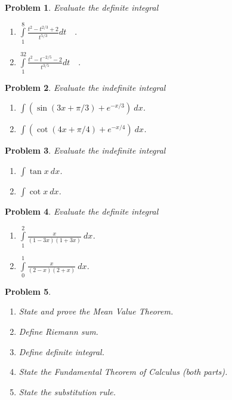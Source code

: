 \documentclass{article}
\newtheorem{problem}{Problem}
\begin{document}
\begin{problem}
Evaluate the definite integral
\begin{enumerate}
\item $\int\limits_{1}^{8} \frac{t^{2}-t^{2/3}+2}{t^{5/3}} dt\quad .$
\item $\int\limits_{1}^{32} \frac{t^{2}-t^{-2/5}-2}{t^{3/5}} dt\quad .$
\end{enumerate}
\end{problem}
\begin{problem}
Evaluate the indefinite integral
\begin{enumerate}
\item $\int (\sin (3x+\pi/3)+e^{-x/3} ) ~dx$.
\item $\int (\cot (4x+\pi/4)+e^{-x/4} )~dx$.
\end{enumerate}
\end{problem}
\begin{problem}
Evaluate the indefinite integral
\begin{enumerate}
\item $\int \tan x ~dx$. \hfill{~}
\item $\int \cot x ~dx$. \hfill{~}
\end{enumerate}
\end{problem}
\begin{problem}
Evaluate the definite integral
\begin{enumerate}
\item $\int\limits_{1}^{2} \frac{x}{(1-3x)(1+3x) }  ~dx$.
\hfill{~}
\item $\int\limits_{0}^1 \frac{x}{(2-x)(2+x) }  ~dx$.
\hfill{~}
\end{enumerate}
\end{problem}
\begin{problem}~
\begin{enumerate}
\item State and prove the Mean Value Theorem.
\item Define Riemann sum.
\item Define definite integral.
\item State the Fundamental Theorem of Calculus (both parts).
\item State the substitution rule.
\end{enumerate}
\end{problem}
\end{document}
